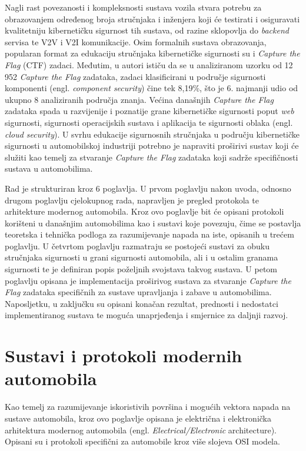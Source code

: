 \documentclass[times, utf8, diplomski, numeric]{fer}
\begin{document}
Nagli rast povezanosti i kompleksnosti sustava vozila stvara potrebu za obrazovanjem određenog broja stručnjaka i inženjera koji će testirati i osiguravati kvalitetniju kibernetičku sigurnost tih sustava, od razine sklopovlja do \textit{backend} servisa te V2V i V2I komunikacije. Osim formalnih sustava obrazovanja, popularan format za edukaciju stručnjaka kibernetičke sigurnosti su i \textit{Capture the Flag} (CTF) zadaci. Međutim, u \cite{vsvabensky2021cybersecurity} autori ističu da se u analiziranom uzorku od 12 952 \textit{Capture the Flag} zadataka, zadaci klasificirani u područje sigurnosti komponenti (engl. \textit{component security}) čine tek 8,19\%, što je 6. najmanji udio od ukupno 8 analiziranih područja znanja. Većina današnjih \textit{Capture the Flag} zadataka spada u razvijenije i poznatije grane kibernetičke sigurnosti poput \textit{web} sigurnosti, sigurnosti operacijskih sustava i aplikacija te sigurnosti oblaka (engl. \textit{cloud security})\cite{prinetto2020hardware}. U svrhu edukacije sigurnosnih stručnjaka u području kibernetičke sigurnosti u automobilskoj industriji potrebno je napraviti proširivi sustav koji će služiti kao temelj za stvaranje \textit{Capture the Flag} zadataka koji sadrže specifičnosti sustava u automobilima.

Rad je strukturiran kroz 6 poglavlja. U prvom poglavlju nakon uvoda, odnosno drugom poglavlju cjelokupnog rada, napravljen je pregled protokola te arhitekture modernog automobila. Kroz ovo poglavlje bit će opisani protokoli korišteni u današnjim automobilima kao i sustavi koje povezuju, čime se postavlja teoretska i tehnička podloga za razumijevanje napada na iste, opisanih u trećem poglavlju. U četvrtom poglavlju razmatraju se postojeći sustavi za obuku stručnjaka sigurnosti u grani sigurnosti automobila, ali i u ostalim granama sigurnosti te je definiran popis poželjnih svojstava takvog sustava. U petom poglavlju opisana je implementacija proširivog sustava za stvaranje \textit{Capture the Flag} zadataka specifičnih za sustave upravljanja i zabave u automobilima. Naposljetku, u zaključku su opisani konačan rezultat, prednosti i nedostatci implementiranog sustava te moguća unaprjeđenja i smjernice za daljnji razvoj.

\chapter{Sustavi i protokoli modernih automobila}
Kao temelj za razumijevanje iskoristivih površina i mogućih vektora napada na sustave automobila, kroz ovo poglavlje opisana je električna i elektronička arhitektura modernog automobila (engl. \textit{Electrical/Electronic} architecture). Opisani su i protokoli specifični za automobile kroz više slojeva OSI modela.
\end{document}
